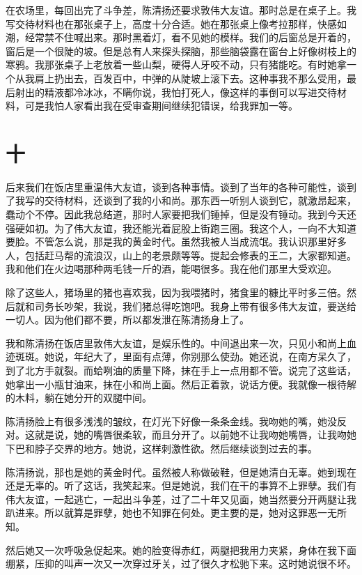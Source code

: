  在农场里，每回出完了斗争差，陈清扬还要求敦伟大友谊。那时总是在桌子上。我写交待材料也在那张桌子上，高度十分合适。她在那张桌上像考拉那样，快感如潮，经常禁不住喊出来。那时黑着灯，看不见她的模样。我们的后窗总是开着的，窗后是一个很陡的坡。但是总有人来探头探脑，那些脑袋露在窗台上好像树枝上的寒鸦。我那张桌子上老放着一些山梨，硬得人牙咬不动，只有猪能吃。有时她拿一个从我肩上扔出去，百发百中，中弹的从陡坡上滚下去。这种事我不那么受用，最后射出的精液都冷冰冰，不瞒你说，我怕打死人，像这样的事倒可以写进交待材料，可是我怕人家看出我在受审查期间继续犯错误，给我罪加一等。 
 
 

\section{十} 
 
后来我们在饭店里重温伟大友谊，谈到各种事情。谈到了当年的各种可能性，谈到了我写的交待材料，还谈到了我的小和尚。那东西一听别人谈到它，就激昂起来，蠢动个不停。因此我总结道，那时人家要把我们锤掉，但是没有锤动。我到今天还强硬如初。为了伟大友谊，我还能光着屁股上街跑三圈。我这个人，一向不大知道要脸。不管怎么说，那是我的黄金时代。虽然我被人当成流氓。我认识那里好多人，包括赶马帮的流浪汉，山上的老景颇等等。提起会修表的王二，大家都知道。我和他们在火边喝那种两毛钱一斤的酒，能喝很多。我在他们那里大受欢迎。 
 
 除了这些人，猪场里的猪也喜欢我，因为我喂猪时，猪食里的糠比平时多三倍。然后就和司务长吵架，我说，我们猪总得吃饱吧。我身上带有很多伟大友谊，要送给一切人。因为他们都不要，所以都发泄在陈清扬身上了。 
 
 我和陈清扬在饭店里敦伟大友谊，是娱乐性的。中间退出来一次，只见小和尚上血迹斑斑。她说，年纪大了，里面有点薄，你别那么使劲。她还说，在南方呆久了，到了北方手就裂。而蛤咧油的质量下降，抹在手上一点用都不管。说完了这些话，她拿出一小瓶甘油来，抹在小和尚上面。然后正着敦，说话方便。我就像一根待解的木料，躺在她分开的双腿中间。 
 
 陈清扬脸上有很多浅浅的皱纹，在灯光下好像一条条金线。我吻她的嘴，她没反对。这就是说，她的嘴唇很柔软，而且分开了。以前她不让我吻她嘴唇，让我吻她下巴和脖子交界的地方。她说，这样刺激性欲。然后继续谈到过去的事。 
 
 陈清扬说，那也是她的黄金时代。虽然被人称做破鞋，但是她清白无辜。她到现在还是无辜的。听了这话，我笑起来。但是她说，我们在干的事算不上罪孽。我们有伟大友谊，一起逃亡，一起出斗争差，过了二十年又见面，她当然要分开两腿让我趴进来。所以就算是罪孽，她也不知罪在何处。更主要的是，她对这罪恶一无所知。 
 
 然后她又一次呼吸急促起来。她的脸变得赤红，两腿把我用力夹紧，身体在我下面绷紧，压抑的叫声一次又一次穿过牙关，过了很久才松驰下来。这时她说很不坏。 
 
